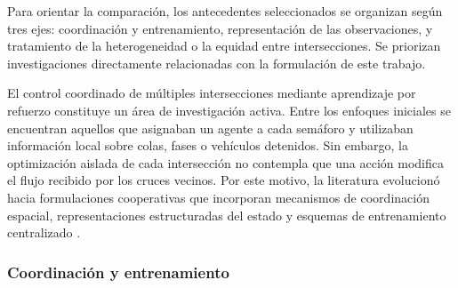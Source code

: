 Para orientar la comparación, los antecedentes seleccionados se organizan según tres ejes: coordinación y entrenamiento, representación de las observaciones, y tratamiento de la heterogeneidad o la equidad entre intersecciones. Se priorizan investigaciones directamente relacionadas con la formulación de este trabajo.

El control coordinado de múltiples intersecciones mediante aprendizaje por refuerzo constituye un área de investigación activa. Entre los enfoques iniciales se encuentran aquellos que asignaban un agente a cada semáforo y utilizaban información local sobre colas, fases o vehículos detenidos. Sin embargo, la optimización aislada de cada intersección no contempla que una acción modifica el flujo recibido por los cruces vecinos. Por este motivo, la literatura evolucionó hacia formulaciones cooperativas que incorporan mecanismos de coordinación espacial, representaciones estructuradas del estado y esquemas de entrenamiento centralizado \cite{marlbook,liang2025marlreview}.

\subsubsection{Coordinación y entrenamiento}

